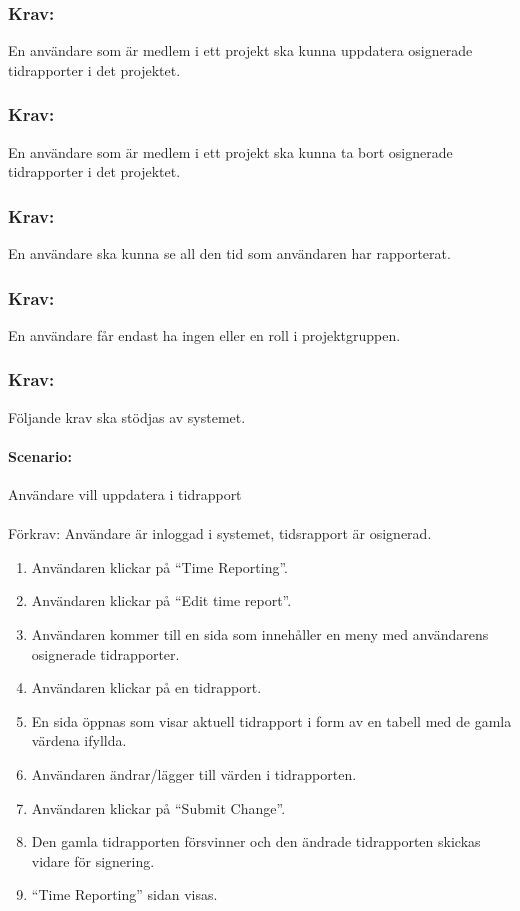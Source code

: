 \documentclass[paper=a4, fontsize=11pt,twoside]{article}
\begin{document}
 \subsubsection{Krav:} En användare som är medlem i ett projekt ska kunna uppdatera osignerade tidrapporter i det projektet.
 \subsubsection{Krav:} En användare som är medlem i ett projekt ska kunna ta bort osignerade tidrapporter i det projektet.
\subsubsection{Krav:}En användare ska kunna se all den tid som användaren har rapporterat.
\subsubsection{Krav:}En användare får endast ha ingen eller en roll i projektgruppen.
\subsubsection{Krav:} Följande krav ska stödjas av systemet.
\paragraph{Scenario:}Användare vill uppdatera i tidrapport
\paragraph{}
Förkrav: Användare är inloggad i systemet, tidsrapport är osignerad.
 \begin{enumerate}
 \item Användaren klickar på “Time Reporting”.
 \item	Användaren klickar på “Edit time report”.
 \item	Användaren kommer till en sida som innehåller en meny med användarens osignerade tidrapporter.
 \item 	Användaren klickar på en tidrapport.
 \item	En sida öppnas som visar aktuell tidrapport i form av en tabell med de gamla värdena ifyllda.
 \item	Användaren ändrar/lägger till värden i tidrapporten.
 \item	Användaren klickar på “Submit Change”.
 \item	Den gamla tidrapporten försvinner och den ändrade tidrapporten skickas vidare för signering.
 \item	“Time Reporting” sidan visas.
 	
 \end{enumerate}
\end{document}
